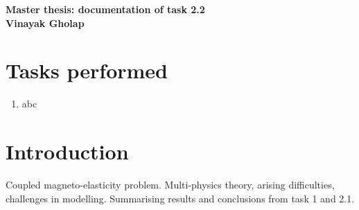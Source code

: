 \documentclass[11pt,a4paper,final]{article}
\begin{document}
\begin{center}
\textbf{\Large Master thesis: documentation of task 2.2}\\ \vspace{0.25cm}
\textbf{\large Vinayak Gholap}
\end{center}

\section{Tasks performed}
\begin{enumerate}
\item abc
\end{enumerate}

\section{Introduction}
Coupled magneto-elasticity problem. Multi-physics theory, arising difficulties, challenges in modelling. Summarising results and conclusions from task 1 and 2.1. 
\end{document}
